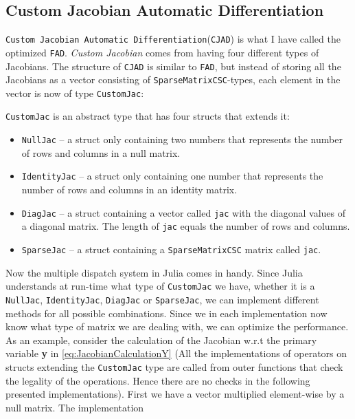 \subsection{Custom Jacobian Automatic Differentiation}
\texttt{Custom Jacobian Automatic Differentiation}(\texttt{CJAD}) is what I have called the optimized \texttt{FAD}. \textit{Custom Jacobian} comes from having four different types of Jacobians. The structure of \texttt{CJAD} is similar to \texttt{FAD}, but instead of storing all the Jacobians as a vector consisting of \texttt{SparseMatrixCSC}-types, each element in the vector is now of type \texttt{CustomJac}:

\texttt{CustomJac} is an abstract type that has four structs that extends it:
\begin{itemize}
    \item \texttt{NullJac} -- a struct only containing two numbers that represents the number of rows and columns in a null matrix.
    \item \texttt{IdentityJac} -- a struct only containing one number that represents the number of rows and columns in an identity matrix.
    \item \texttt{DiagJac} -- a struct containing a vector called \texttt{jac} with the diagonal values of a diagonal matrix. The length of \texttt{jac} equals the number of rows and columns.
    \item \texttt{SparseJac} -- a struct containing a \texttt{SparseMatrixCSC} matrix called \texttt{jac}.
\end{itemize}
Now the multiple dispatch system in Julia comes in handy. Since Julia understands at run-time what type of \texttt{CustomJac} we have, whether it is a \texttt{NullJac}, \texttt{IdentityJac}, \texttt{DiagJac} or \texttt{SparseJac}, we can implement different methods for all possible combinations. Since we in each implementation now know what type of matrix we are dealing with, we can optimize the performance. As an example, consider the calculation of the Jacobian w.r.t the primary variable \textbf{y} in \eqref{eq:JacobianCalculationY} (All the implementations of operators on structs extending the \texttt{CustomJac} type are called from outer functions that check the legality of the operations. Hence there are no checks in the following presented implementations). First we have a vector multiplied element-wise by a null matrix. The implementation

